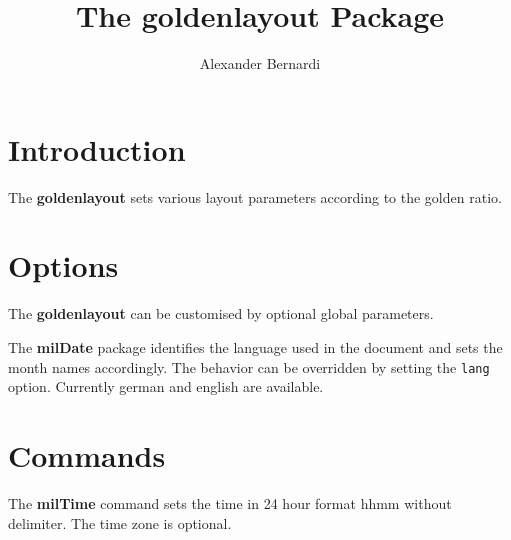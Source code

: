 \documentclass[a4paper,10pt]{scrarticle}
\title{\textnormal{The \textbf{goldenlayout} Package}}
\author{Alexander Bernardi}
\begin{document}
\maketitle

\section{Introduction}

The \textbf{goldenlayout} sets various layout parameters according to the golden ratio.

\section{Options}

The \textbf{goldenlayout} can be customised by optional global parameters.

\noindent{} The \textbf{milDate} package identifies the language used in the document and sets the month names accordingly. The behavior can be overridden by setting the \verb+lang+ option.
Currently german and english are available.

\noindent{}

\noindent{}


\section{Commands}

\noindent{} The \textbf{milTime} command sets the time in 24 hour format hhmm without delimiter. The time zone is optional.
\end{document}
